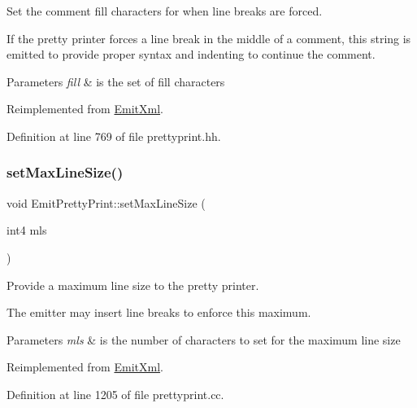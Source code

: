 Set the comment fill characters for when line breaks are forced. 

If the pretty printer forces a line break in the middle of a comment, this string is emitted to provide proper syntax and indenting to continue the comment. 
\begin{DoxyParams}{Parameters}
{\em fill} & is the set of fill characters \\
\hline
\end{DoxyParams}


Reimplemented from \mbox{\hyperlink{class_emit_xml_a51e2d9c79cebe75ed8e33bb7513d86cf}{Emit\+Xml}}.



Definition at line 769 of file prettyprint.\+hh.

\mbox{\label{class_emit_pretty_print_a998863b23c0a4a8e8f8c061453fffaf7}} 
\subsubsection{\texorpdfstring{setMaxLineSize()}{setMaxLineSize()}}
{\footnotesize\ttfamily void Emit\+Pretty\+Print\+::set\+Max\+Line\+Size (\begin{DoxyParamCaption}\item[{int4}]{mls }\end{DoxyParamCaption})\hspace{0.3cm}{\ttfamily [virtual]}}



Provide a maximum line size to the pretty printer. 

The emitter may insert line breaks to enforce this maximum. 
\begin{DoxyParams}{Parameters}
{\em mls} & is the number of characters to set for the maximum line size \\
\hline
\end{DoxyParams}


Reimplemented from \mbox{\hyperlink{class_emit_xml_a037f97e86e503c8f2cf61faf5f510ec2}{Emit\+Xml}}.



Definition at line 1205 of file prettyprint.\+cc.

